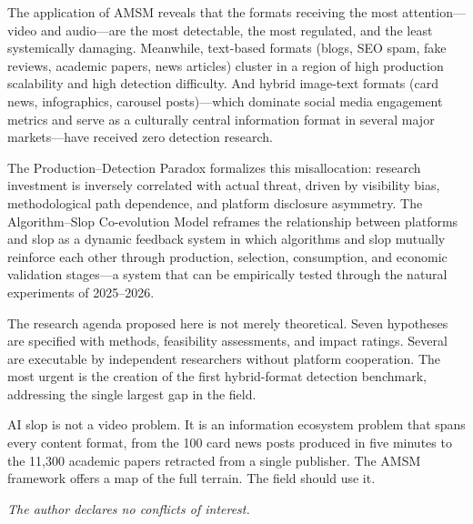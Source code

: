 \documentclass[12pt,a4paper]{article}
\begin{document}
The application of AMSM reveals that the formats receiving the most attention---video and audio---are the most detectable, the most regulated, and the least systemically damaging. Meanwhile, text-based formats (blogs, SEO spam, fake reviews, academic papers, news articles) cluster in a region of high production scalability and high detection difficulty. And hybrid image-text formats (card news, infographics, carousel posts)---which dominate social media engagement metrics and serve as a culturally central information format in several major markets---have received zero detection research.

The Production--Detection Paradox formalizes this misallocation: research investment is inversely correlated with actual threat, driven by visibility bias, methodological path dependence, and platform disclosure asymmetry. The Algorithm--Slop Co-evolution Model reframes the relationship between platforms and slop as a dynamic feedback system in which algorithms and slop mutually reinforce each other through production, selection, consumption, and economic validation stages---a system that can be empirically tested through the natural experiments of 2025--2026.

The research agenda proposed here is not merely theoretical. Seven hypotheses are specified with methods, feasibility assessments, and impact ratings. Several are executable by independent researchers without platform cooperation. The most urgent is the creation of the first hybrid-format detection benchmark, addressing the single largest gap in the field.

AI slop is not a video problem. It is an information ecosystem problem that spans every content format, from the 100 card news posts produced in five minutes to the 11,300 academic papers retracted from a single publisher. The AMSM framework offers a map of the full terrain. The field should use it.

\vspace{1em}
\noindent\textit{The author declares no conflicts of interest.}


\newpage
\printbibliography
\end{document}
